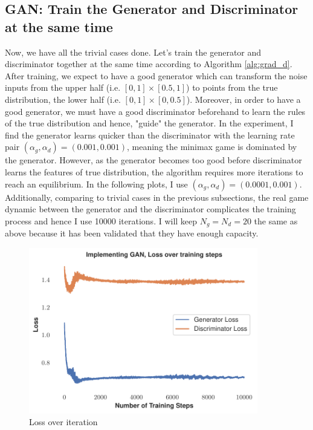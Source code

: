 \subsection{GAN: Train the Generator and Discriminator at the same time}
Now, we have all the trivial cases done. Let's train the generator and discriminator together at the same time according to Algorithm \ref{alg:grad_d}. After training, we expect to have a good generator which can transform the noise inputs from the upper half (i.e. $[0,1] \times [0.5,1]$) to points from the true distribution, the lower half (i.e. $[0,1] \times [0,0.5]$). Moreover, in order to have a good generator, we must have a good discriminator beforehand to learn the rules of the true distribution and hence, "guide" the generator. In the experiment, I find the generator learns quicker than the discriminator with the learning rate pair $(\alpha_g,\alpha_d) = (0.001,0.001)$, meaning the minimax game is dominated by the generator. However, as the generator becomes too good before discriminator learns the features of true distribution, the algorithm requires more iterations to reach an equilibrium. In the following plots, I use $(\alpha_g,\alpha_d) = (0.0001,0.001)$. Additionally, comparing to trivial cases in the previous subsections, the real game dynamic between the generator and the discriminator complicates the training process and hence I use 10000 iterations. I will keep $N_g = N_d = 20$ the same as above because it has been validated that they have enough capacity. 
\begin{figure}[H]
    \centering
    \includegraphics[width = 10cm]{GAN.pdf}
    \caption{Loss over iteration}
    \label{fig:Gan}
\end{figure}
